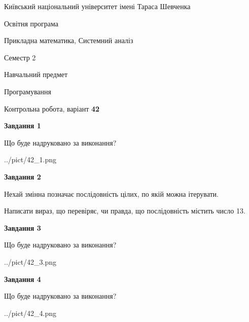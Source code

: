 \documentclass[12pt, ukrainian]{article}
\begin{document}
{{\begin {small}\par
{ \center  Київський національний університет імені Тараса Шевченка \par}
{\parbox {5 cm}{Освітня програма \hfill}{\parbox {8 cm}{Прикладна математика, Системний аналіз \hfill}}\parbox {5 cm}{\hfill Семестр 2}}\par
{\parbox {5 cm} {Навчальний предмет \hfill}\parbox {7 cm}{Програмування \hfill}\parbox {6cm}{\hfill}\par}\vspace{-7pt} \end{small}}{\center Контрольна робота, варіант  \No \textbf
{ 42 }\par}}
{
\begin {large}
{\begin {center}\textbf{Завдання 1}\end {center}}\par
Що буде надруковано за виконання?\par\par
\begin{center}
	{../pict/42_1.png}
\end{center}
\newpage

{\begin {center}\textbf{Завдання 2}\end {center}}\par
Нехай змінна  позначає послідовність цілих, по якій можна ітерувати.

Написати вираз, що перевіряє, чи правда, що послідовність  містить число 13.\par
\newpage

{\begin {center}\textbf{Завдання 3}\end {center}}\par
Що буде надруковано за виконання?\par
\begin{center}
	{../pict/42_3.png}
\end{center}
\newpage

{\begin {center}\textbf{Завдання 4}\end {center}}\par
Що буде надруковано за виконання?\par
\begin{center}
	{../pict/42_4.png}
\end{center}
\newpage


\end{large}}
\end{document}
